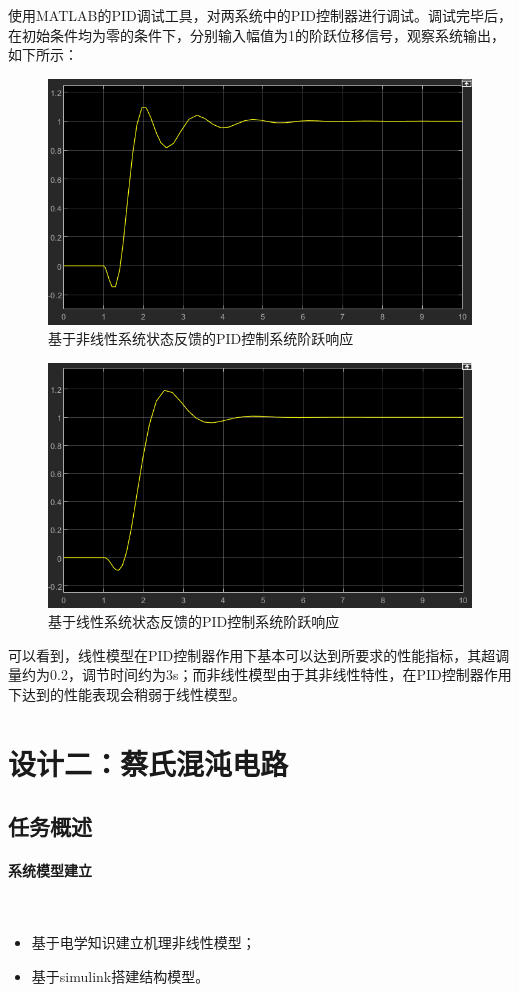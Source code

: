 \documentclass[UTF8]{article}
\begin{document}
使用MATLAB的PID调试工具，对两系统中的PID控制器进行调试。调试完毕后，在初始条件均为零的条件下，分别输入幅值为1的阶跃位移信号，观察系统输出，如下所示：
\begin{figure}[H]
    \centering %
    \includegraphics[width=.6\textwidth]{figure/倒立摆-非线性-pid-输出.png}
    \caption{基于非线性系统状态反馈的PID控制系统阶跃响应} %
\end{figure}
\begin{figure}[H]
    \centering %
    \includegraphics[width=.6\textwidth]{figure/倒立摆-线性-pid-输出.png}
    \caption{基于线性系统状态反馈的PID控制系统阶跃响应} %
\end{figure}
可以看到，线性模型在PID控制器作用下基本可以达到所要求的性能指标，其超调量约为0.2，调节时间约为3s；而非线性模型由于其非线性特性，在PID控制器作用下达到的性能表现会稍弱于线性模型。

%
\section{设计二：蔡氏混沌电路}
\subsection{任务概述}
\paragraph{系统模型建立}~{}
\begin{itemize}
	\item 基于电学知识建立机理非线性模型；
	\item 基于simulink搭建结构模型。
\end{itemize}
\end{document}

